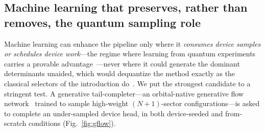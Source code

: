 \subsection{Machine learning that preserves, rather than removes, the quantum sampling role}
Machine learning can enhance the pipeline only where it \emph{consumes device samples or schedules
device work}---the regime where learning from quantum experiments carries a provable
advantage~\cite{huang2022}---never where it could generate the dominant determinants unaided, which
would dequantize the method exactly as the classical selectors of the introduction
do~\cite{belagali2026,hinqs2026,review}. We put the strongest candidate to a stringent test. A
generative tail-completer---an orbital-native generative flow network~\cite{bengio2021}
trained to sample high-weight $(N{+}1)$-sector configurations---is asked to complete an under-sampled
device head, in both device-seeded and from-scratch conditions (Fig.~\ref{fig:gflow}).

